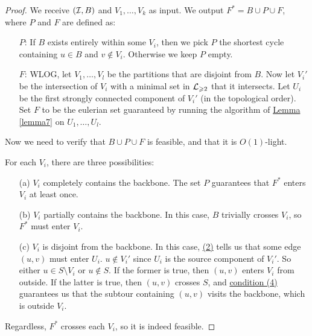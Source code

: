 \documentclass[./main.tex]{subfiles}
\begin{document}
		\begin{proof}
			We receive $(\mathcal{I},B)$ and $V_1,\ldots,V_k$ as input. We output $F^*=B\cup P\cup F$, where $P$ and $F$ are defined as:

			\begin{enumerate}
				\item[$P$:] If $B$ exists entirely within some $V_i$, then we pick $P$ the shortest cycle containing $u\in B$ and $v\notin V_i$. Otherwise we keep $P$ empty.

				\item[$F$:] WLOG, let $V_1,\ldots,V_l$ be the partitions that are disjoint from $B$. Now let $V_i'$ be the intersection of $V_i$ with a minimal set in $\mathcal{L}_{\geqslant 2}$ that it intersects. Let $U_i$ be the first strongly connected component of $V_i'$ (in the topological order). Set $F$ to be the eulerian set guaranteed by running the algorithm of \hyperref[lemma7]{Lemma \ref{lemma7}} on $U_1,\ldots,U_l$.
			\end{enumerate}\vspace{2mm}

			Now we need to verify that $B\cup P\cup F$ is feasible, and that it is $O(1)$-light.\vspace{2mm}

			For each $V_i$, there are three possibilities:
			\begin{enumerate}
				\item[(a)] $V_i$ completely contains the backbone. The set $P$ guarantees that $F^*$ enters $V_i$ at least once.

				\item[(b)] $V_i$ partially contains the backbone. In this case, $B$ trivially crosses $V_i$, so $F^*$ must enter $V_i$.

				\item[(c)] $V_i$ is disjoint from the backbone. In this case, \hyperref[lemm:main:2]{(2)} tells us that some edge $(u,v)$ must enter $U_i$. $u\notin V_i'$ since $U_i$ is the source component of $V_i'$. So either $u\in S\setminus V_i$ or $u\notin S$. If the former is true, then $(u,v)$ enters $V_i$ from outside. If the latter is true, then $(u,v)$ crosses $S$, and \hyperref[lemm:main:4]{condition (4)} guarantees us that the subtour containing $(u,v)$ visits the backbone, which is outside $V_i$.
			\end{enumerate}

			Regardless, $F^*$ crosses each $V_i$, so it is indeed feasible.\vspace{2mm}


\end{proof}
\end{document}
